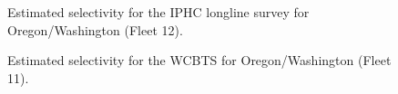 \documentclass[
]{scrartcl}
\begin{document}
\begin{figure}


\caption{\label{fig-sel12}Estimated selectivity for the IPHC longline
survey for Oregon/Washington (Fleet 12).}

\end{figure}%

\begin{figure}


\caption{\label{fig-sel11}Estimated selectivity for the WCBTS for
Oregon/Washington (Fleet 11).}

\end{figure}%
\end{document}
